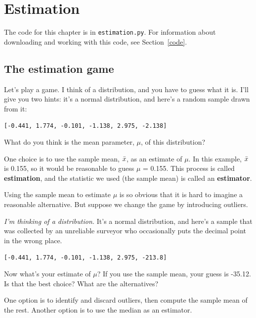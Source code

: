 \documentclass[12pt]{book}
\begin{document}
\chapter{Estimation}
\label{estimation}

The code for this chapter is in {\tt estimation.py}.  For information
about downloading and working with this code, see Section~\ref{code}.


\section{The estimation game}

Let's play a game.  I think of a distribution, and you have to guess
what it is.  I'll give you two hints: it's a
normal distribution, and here's a random sample drawn from it:

{\tt [-0.441, 1.774, -0.101, -1.138, 2.975, -2.138]}

What do you think is the mean parameter, $\mu$, of this distribution?

One choice is to use the sample mean, $\bar{x}$, as an estimate of $\mu$.
In this example, $\bar{x}$ is 0.155, so it would
be reasonable to guess $\mu$ = 0.155.
This process is called {\bf estimation}, and the statistic we used
(the sample mean) is called an {\bf estimator}.

Using the sample mean to estimate $\mu$ is so obvious that it is hard
to imagine a reasonable alternative.  But suppose we change the game by
introducing outliers.

{\em I'm thinking of a distribution.}  It's a normal distribution, and
here's a sample that was collected by an unreliable surveyor who
occasionally puts the decimal point in the wrong place.

{\tt [-0.441, 1.774, -0.101, -1.138, 2.975, -213.8]}

Now what's your estimate of $\mu$?  If you use the sample mean, your
guess is -35.12.  Is that the best choice?  What are the alternatives?

One option is to identify and discard outliers, then compute the sample
mean of the rest.  Another option is to use the median as an estimator.
\end{document}
